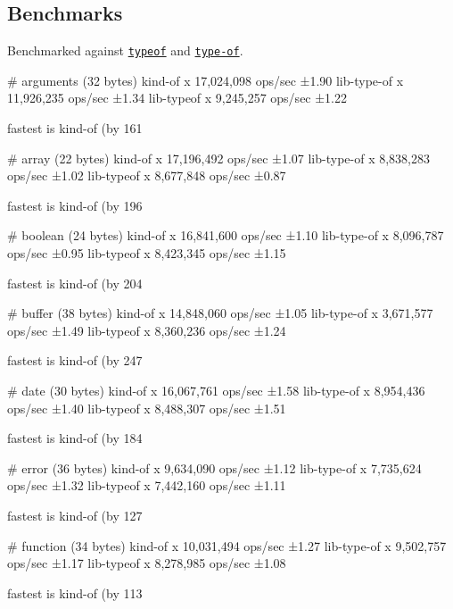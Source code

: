 \subsection*{Benchmarks}

Benchmarked against \href{http://github.com/CodingFu/typeof}{\tt typeof} and \href{https://github.com/ForbesLindesay/type-of}{\tt type-\/of}.


\begin{DoxyCode}
# arguments (32 bytes)
  kind-of x 17,024,098 ops/sec ±1.90%
  lib-type-of x 11,926,235 ops/sec ±1.34%
  lib-typeof x 9,245,257 ops/sec ±1.22%

  fastest is kind-of (by 161%

# array (22 bytes)
  kind-of x 17,196,492 ops/sec ±1.07%
  lib-type-of x 8,838,283 ops/sec ±1.02%
  lib-typeof x 8,677,848 ops/sec ±0.87%

  fastest is kind-of (by 196%

# boolean (24 bytes)
  kind-of x 16,841,600 ops/sec ±1.10%
  lib-type-of x 8,096,787 ops/sec ±0.95%
  lib-typeof x 8,423,345 ops/sec ±1.15%

  fastest is kind-of (by 204%

# buffer (38 bytes)
  kind-of x 14,848,060 ops/sec ±1.05%
  lib-type-of x 3,671,577 ops/sec ±1.49%
  lib-typeof x 8,360,236 ops/sec ±1.24%

  fastest is kind-of (by 247%

# date (30 bytes)
  kind-of x 16,067,761 ops/sec ±1.58%
  lib-type-of x 8,954,436 ops/sec ±1.40%
  lib-typeof x 8,488,307 ops/sec ±1.51%

  fastest is kind-of (by 184%

# error (36 bytes)
  kind-of x 9,634,090 ops/sec ±1.12%
  lib-type-of x 7,735,624 ops/sec ±1.32%
  lib-typeof x 7,442,160 ops/sec ±1.11%

  fastest is kind-of (by 127%

# function (34 bytes)
  kind-of x 10,031,494 ops/sec ±1.27%
  lib-type-of x 9,502,757 ops/sec ±1.17%
  lib-typeof x 8,278,985 ops/sec ±1.08%

  fastest is kind-of (by 113%


\end{DoxyCode}
